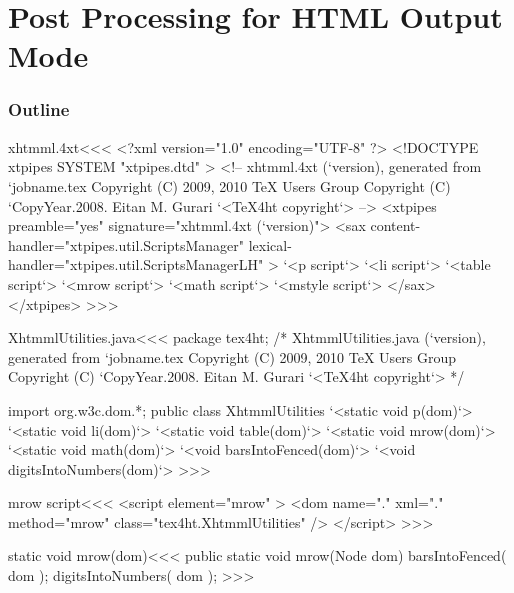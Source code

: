 \documentclass{article}
\begin{document}



\part{Post Processing for HTML Output Mode}


\section{Outline}



\<xhtmml.4xt\><<<
<?xml version="1.0" encoding="UTF-8" ?>
<!DOCTYPE xtpipes SYSTEM "xtpipes.dtd" >
<!-- xhtmml.4xt (`version), generated from `jobname.tex
     Copyright (C) 2009, 2010 TeX Users Group
     Copyright (C) `CopyYear.2008. Eitan M. Gurari
`<TeX4ht copyright`> -->
<xtpipes preamble="yes" signature="xhtmml.4xt (`version)">
   <sax content-handler="xtpipes.util.ScriptsManager" 
        lexical-handler="xtpipes.util.ScriptsManagerLH" >
     `<p script`>
     `<li script`>
     `<table script`>
     `<mrow script`>
     `<math script`>
     `<mstyle script`>
   </sax>
</xtpipes>
>>>


% 


\<XhtmmlUtilities.java\><<<
package tex4ht;
/* XhtmmlUtilities.java (`version), generated from `jobname.tex
   Copyright (C) 2009, 2010 TeX Users Group
   Copyright (C) `CopyYear.2008. Eitan M. Gurari
`<TeX4ht copyright`> */

import org.w3c.dom.*;
public class XhtmmlUtilities {
  `<static void p(dom)`>
  `<static void li(dom)`>
  `<static void table(dom)`>
  `<static void mrow(dom)`>
  `<static void math(dom)`>
  `<void barsIntoFenced(dom)`>
  `<void digitsIntoNumbers(dom)`>
}
>>>





\<mrow script\><<<
<script element="mrow" >
   <dom name="." xml="." method="mrow" class="tex4ht.XhtmmlUtilities" />
</script> 
>>>




\<static void mrow(dom)\><<<
public static void mrow(Node dom) {
   barsIntoFenced( dom );
   digitsIntoNumbers( dom );
}
>>>
\end{document}
